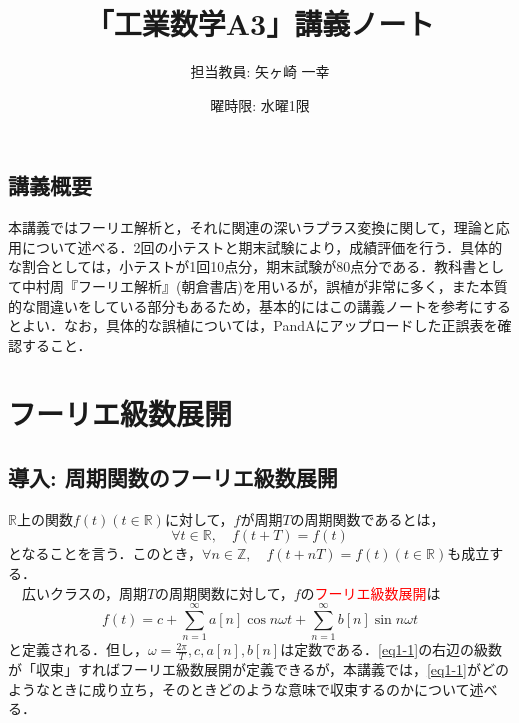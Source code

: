 \documentclass[a4j]{jsbook}
\title{「工業数学A3」講義ノート}
\author{担当教員: 矢ヶ崎 一幸}
\date{曜時限: 水曜1限}
\numberwithin{theorem}{chapter}  %
\begin{document}
\maketitle

\tableofcontents

\newpage

\section*{講義概要}
本講義ではフーリエ解析と，それに関連の深いラプラス変換に関して，理論と応用について述べる．2回の小テストと期末試験により，成績評価を行う．具体的な割合としては，小テストが1回10点分，期末試験が80点分である．教科書として中村周『フーリエ解析』(朝倉書店)を用いるが，誤植が非常に多く，また本質的な間違いをしている部分もあるため，基本的にはこの講義ノートを参考にするとよい．なお，具体的な誤植については，PandAにアップロードした正誤表を確認すること．

\chapter{フーリエ級数展開} \label{chap1}
\section{導入: 周期関数のフーリエ級数展開} \label{sec1-1}
\(\mathbb{R}\)上の関数\(f(t)(t\in\mathbb{R})\)に対して，\(f\)が周期\(T\)の周期関数であるとは，
\begin{equation*}
    \forall t\in\mathbb{R},\quad f(t+T)=f(t)
\end{equation*}
となることを言う．このとき，\(\forall n\in\mathbb{Z},\quad f(t+nT)=f(t)(t\in\mathbb{R})\)も成立する．\\
　広いクラスの，周期\(T\)の周期関数に対して，\(f\)の\textcolor{red}{フーリエ級数展開}は
\begin{equation}
    f(t)=c+\sum_{n=1}^\infty a[n]\cos n\omega t+\sum_{n=1}^\infty b[n]\sin n\omega t \label{eq1-1}
\end{equation}
と定義される．但し，\(\displaystyle \omega=\frac{2\pi}{T}, c, a[n], b[n]\)は定数である．\eqref{eq1-1}の右辺の級数が「収束」すればフーリエ級数展開が定義できるが，本講義では，\eqref{eq1-1}がどのようなときに成り立ち，そのときどのような意味で収束するのかについて述べる．
\end{document}
